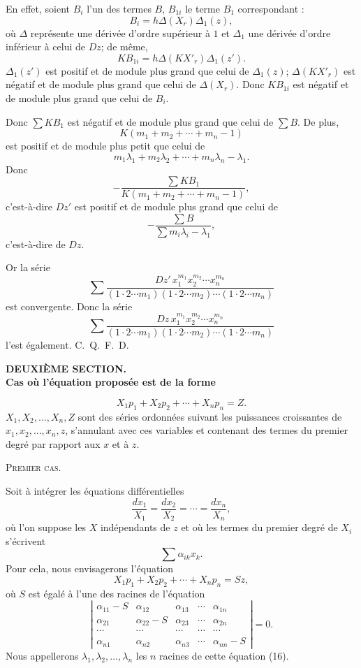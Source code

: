 \documentclass[11pt]{article}
\begin{document}
En effet, soient $B_i$ l’un des termes $B$, $B_{1i}$ le terme $B_1$ correspondant :
\[
B_i=h\Delta(X_r)\Delta_1(z),
\]
où $\Delta$ représente une dérivée d’ordre supérieur à $1$ et $\Delta_1$ une dérivée d’ordre inférieur à celui de $Dz$; de même,
\[
KB_{1i}=h\Delta(KX'_r)\Delta_1(z').
\]
$\Delta_1(z')$ est positif et de module plus grand que celui de $\Delta_1(z)$; $\Delta(KX'_r)$ est négatif et de module plus grand que celui de $\Delta(X_r)$. Donc $KB_{1i}$ est négatif et de module plus grand que celui de $B_i$.

Donc $\sum KB_1$ est négatif et de module plus grand que celui de $\sum B$.
De plus,
\[
K(m_1+m_2+\cdots+m_n-1)
\]
est positif et de module plus petit que celui de
\[
m_1\lambda_1+m_2\lambda_2+\cdots+m_n\lambda_n-\lambda_1.
\]
Donc
\[
-\frac{\sum KB_1}{K(m_1+m_2+\cdots+m_n-1)},
\]
c’est-à-dire $Dz'$ est positif et de module plus grand que celui de
\[
-\frac{\sum B}{\sum m_i\lambda_i-\lambda_1},
\]
c’est-à-dire de $Dz$.

Or la série
\[
\sum
\frac{Dz'\,x_1^{m_1}x_2^{m_2}\cdots x_n^{m_n}}
{(1\cdot2\cdots m_1)(1\cdot2\cdots m_2)\cdots(1\cdot2\cdots m_n)}
\]
est convergente. Donc la série
\[
\sum
\frac{Dz\,x_1^{m_1}x_2^{m_2}\cdots x_n^{m_n}}
{(1\cdot2\cdots m_1)(1\cdot2\cdots m_2)\cdots(1\cdot2\cdots m_n)}
\]
l’est également. \hfill\mbox{C. Q. F. D.}

\begin{center}
{\bfseries DEUXIÈME SECTION.}\\[0.8em]
{\bfseries Cas où l’équation proposée est de la forme}
\end{center}
\[
X_1p_1+X_2p_2+\cdots+X_np_n=Z.
\]
$X_1,X_2,\ldots,X_n,Z$ sont des séries ordonnées suivant les puissances croissantes de $x_1,x_2,\ldots,x_n,z$, s’annulant avec ces variables et contenant des termes du premier degré par rapport aux $x$ et à $z$.

\begin{center}
{\scshape Premier cas.}
\end{center}

Soit à intégrer les équations différentielles
\[
\frac{dx_1}{X_1}=\frac{dx_2}{X_2}=\cdots=\frac{dx_n}{X_n},
\]
où l’on suppose les $X$ indépendants de $z$ et où les termes du premier degré de $X_i$ s’écrivent
\[
\sum \alpha_{ik}x_k.
\]
Pour cela, nous envisagerons l’équation
\begin{equation*}\tag{15}
X_1p_1+X_2p_2+\cdots+X_np_n=Sz,
\end{equation*}
où $S$ est égalé à l’une des racines de l’équation
\begin{equation*}\tag{16}
\left|
\begin{array}{ccccc}
\alpha_{11}-S&\alpha_{12}&\alpha_{13}&\cdots&\alpha_{1n}\\
\alpha_{21}&\alpha_{22}-S&\alpha_{23}&\cdots&\alpha_{2n}\\
\cdots&\cdots&\cdots&\cdots&\cdots\\
\alpha_{n1}&\alpha_{n2}&\alpha_{n3}&\cdots&\alpha_{nn}-S
\end{array}
\right|=0.
\end{equation*}
Nous appellerons $\lambda_1,\lambda_2,\ldots,\lambda_n$ les $n$ racines de cette équation (16).
\end{document}
